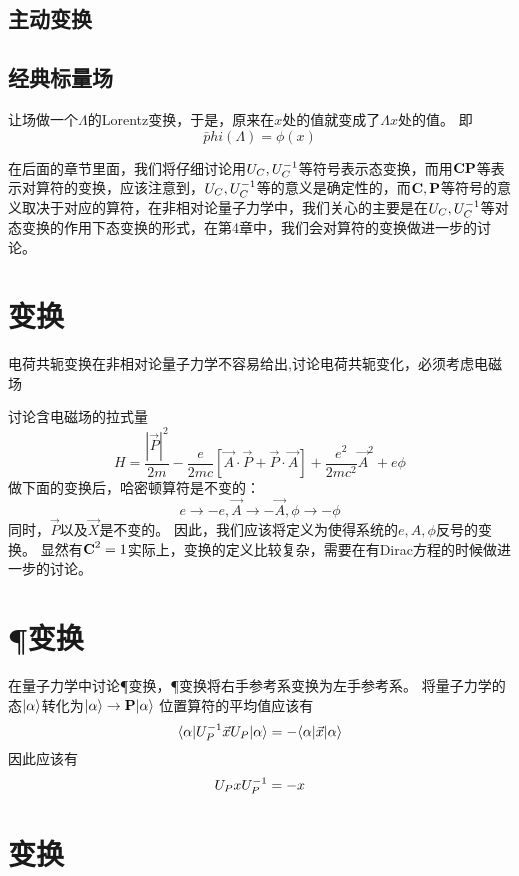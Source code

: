 \subsection{主动变换}
\subsection{经典标量场}
让场做一个$\Lambda$的Lorentz变换，于是，原来在$x$处的值就变成了$\Lambda x$处的值。
即
\begin{equation}
    \bar phi(\Lambda) = \phi(x)
\end{equation}

在后面的章节里面，我们将仔细讨论用$U_{C},U_{C}^{-1}$等符号表示态变换，而用$\textbf{C} \textbf{P}$等表示对算符的变换，应该注意到，$U_{C},U_{C}^{-1}$等的意义是确定性的，而$\textbf{C},\textbf{P}$等符号的意义取决于对应的算符，在非相对论量子力学中，我们关心的主要是在$U_{C},U_{C}^{-1}$等对态变换的作用下态变换的形式，在第4章中，我们会对算符的变换做进一步的讨论。

\section{\C 变换}
电荷共轭变换在非相对论量子力学不容易给出,讨论电荷共轭变化，必须考虑电磁场

讨论含电磁场的拉式量
\begin{equation}
H = \frac{|\vec P|^2}{2m} - \frac e{2mc}[\vec A \cdot \vec P + \vec P \cdot \vec A] + \frac{e^2}{2mc^2}\vec A^2 + e\phi
\end{equation}
做下面的变换后，哈密顿算符是不变的：
\begin{equation}
    e\rightarrow-e, \vec A \rightarrow -\vec A, \phi\rightarrow -\phi
\end{equation}
同时，$\vec P$以及$\vec X$是不变的。
因此，我们应该将\C 定义为使得系统的$e,A,\phi$反号的变换。
显然有$\textbf{C}^2 = 1$实际上，\C 变换的定义比较复杂，需要在有Dirac方程的时候做进一步的讨论。
\section{\P 变换}
在量子力学中讨论\P 变换，\P 变换将右手参考系变换为左手参考系。
将量子力学的态$|\alpha\rangle$转化为$|\alpha\rangle\rightarrow\textbf{P}|\alpha\rangle$
位置算符的平均值应该有
\begin{equation}
    \langle \alpha|U_{P}^{-1}\vec x U_{P}|\alpha\rangle = - \langle \alpha|\vec x|\alpha\rangle
\end{equation}
因此应该有
\begin{equation}
    U_{P} xU_{P}^{-1} = -x
\end{equation}
\section{\T 变换}

